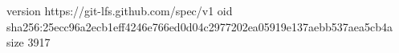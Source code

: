 version https://git-lfs.github.com/spec/v1
oid sha256:25ecc96a2ecb1eff4246e766ed0d04c2977202ea05919e137aebb537aea5cb4a
size 3917
